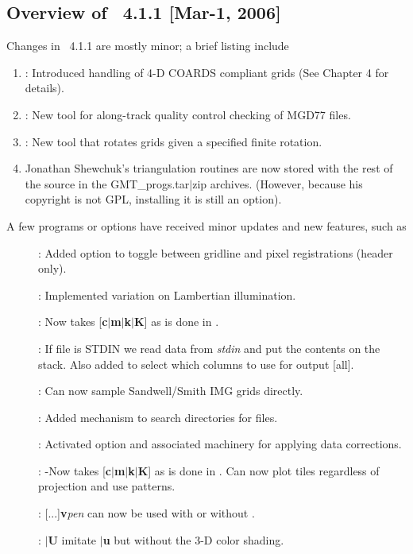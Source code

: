 
\subsection{Overview of \gmt\ 4.1.1 [Mar-1, 2006]}

Changes in \GMT\ 4.1.1 are mostly minor; a brief listing include

\begin{enumerate}
\item {}: Introduced handling of 4-D COARDS compliant grids (See Chapter 4 for details).
\item {}: New tool for along-track quality control checking of MGD77 files.
\item {}: New tool that rotates grids given a specified finite rotation.
\item Jonathan Shewchuk's triangulation routines are now stored with the rest of the source in the GMT\_progs.tar$|$zip archives.
(However, because his copyright is not GPL, installing it is still an option).
\end{enumerate}

A few programs or options have received minor updates and new features, such as

\begin{description}
\item []: Added option  to toggle between gridline and pixel registrations (header only).
\item []: Implemented variation on Lambertian illumination.
\item []: Now takes [{\bf c$|$m$|$k$|$K}] as is done in .
\item []: If file is STDIN we read data from {\it stdin} and put the contents on the stack.
Also added  to select which columns to use for output [all].
\item []: Can now sample Sandwell/Smith IMG grids directly.
\item []: Added mechanism to search directories for files.
\item []: Activated  option and associated machinery for applying data corrections.
\item []: -Now takes [{\bf c$|$m$|$k$|$K}] as is done in .
Can now plot tiles regardless of projection and use patterns.
\item []: [...]{\bf v}{\it pen} can now be used with or without .
\item []: $|${\bf U} imitate $|${\bf u} but without the 3-D color shading.
\end{description}

